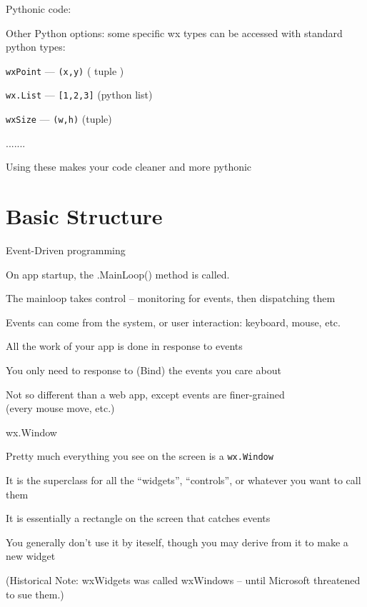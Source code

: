 \documentclass{beamer}
\begin{document}
\begin{frame}[fragile]{Pythonic code:}


\vfill
{\Large Other Python options: some specific wx types can be accessed with standard python types:}

\vfill
{\large \verb`wxPoint` --- \verb`(x,y)` ( tuple ) }

\vfill
{\large \verb`wx.List` --- \verb`[1,2,3]` (python list) }

\vfill
{\large \verb`wxSize` --- \verb`(w,h)` (tuple) }

\vfill
{\large ....... }


\vfill
{\Large Using these makes your code cleaner and more pythonic}

\end{frame}

\section{Basic Structure}

\begin{frame}[fragile]{Event-Driven programming}

\vfill
{\large On app startup, the .MainLoop() method is called.}

\vfill
{\large The mainloop takes control -- monitoring for events, then dispatching them}

\vfill
{\large Events can come from the system, or user interaction: keyboard, mouse, etc.}

\vfill
{\large All the work of your app is done in response to events}

\vfill
{\large You only need to response to (Bind) the events you care about}

\vfill
{\large Not so different than a web app, except events are finer-grained}\\
(every mouse move, etc.)


\end{frame}


\begin{frame}[fragile]{wx.Window}

\vfill
{\Large Pretty much everything you see on the screen is a \verb`wx.Window`}

\vfill
{\Large It is the superclass for all the ``widgets'', ``controls'', or whatever you want to call them}

\vfill
{\Large It is essentially a rectangle on the screen that catches events}

\vfill
{\Large You generally don't use it by iteself, though you may derive from it to make a new widget}

\vfill
{\large(Historical Note: wxWidgets was called wxWindows -- until Microsoft threatened to sue them.)}

\end{frame}
\end{document}
